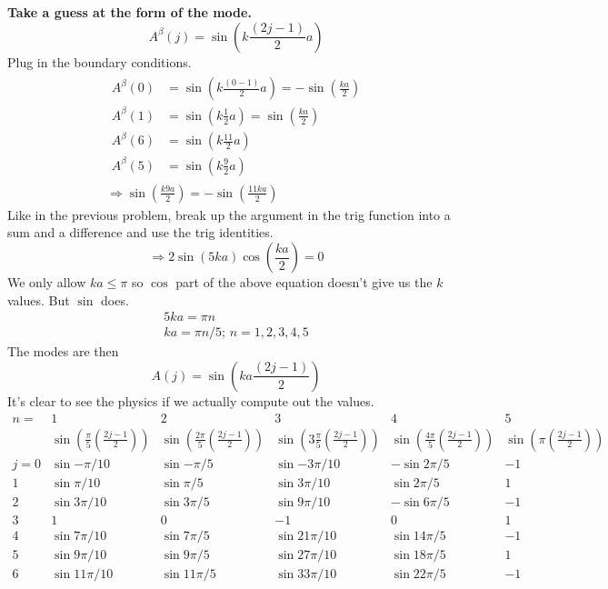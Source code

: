 \documentclass[twoside,10pt]{amsart}
\begin{document}
\textbf{Take a guess at the form of the mode.}
\[
A^{\beta}(j) = \sin{ (k \frac{(2j-1)}{2} a ) }
\]
Plug in the boundary conditions.  
\[
\begin{gathered}
\begin{aligned}
  A^{\beta}(0) & = \sin{ (k \frac{ (0-1)}{2} a ) } = -\sin{ (\frac{ka}{2} ) }  \\
  A^{\beta}(1) & = \sin{ (k \frac{1}{2} a) } = \sin{ (\frac{ka}{2} )}  \\
  A^{\beta}(6) & = \sin{ (k \frac{11}{2} a) }  \\
  A^{\beta}(5) & = \sin{ (k \frac{9}{2} a ) } 
\end{aligned}  \\
\Longrightarrow \sin{ \left( \frac{k9a}{2} \right)} = -  \sin{ \left( \frac{11ka}{2} \right)}
\end{gathered}
\]
Like in the previous problem, break up the argument in the trig function into a sum and a difference and use the trig identities.  
\[
\Longrightarrow 2 \sin{ (5ka)}\cos{ \left( \frac{ka}{2} \right)} = 0 
\]
We only allow $ka \leq \pi$ so $\cos$ part of the above equation doesn't give us the $k$ values.  But $\sin$ does.  
\[
\begin{gathered}
5ka = \pi n \\
ka = \pi n/5; \, n =1,2,3,4,5
\end{gathered}
\]
The modes are then
\[
A(j) = \sin{ \left( ka \frac{ (2j-1)}{2} \right) }
\]
It's clear to see the physics if we actually compute out the values. 
\[
\begin{matrix} 
n =      &    1       &          2    &    3               &  4                   & 5          \\
  &    \sin{ \left( \frac{\pi}{5} \left( \frac{2j-1}{2} \right) \right)} &   \sin{ \left( \frac{2\pi}{5} \left( \frac{2j-1}{2} \right) \right)} &   \sin{ \left( 3\frac{\pi}{5} \left( \frac{2j-1}{2} \right) \right)} &   \sin{ \left( \frac{4\pi}{5} \left( \frac{2j-1}{2} \right) \right)} &   \sin{ \left( \pi \left( \frac{2j-1}{2} \right) \right)}  \\
j = 0 & \sin{ -\pi/10} & \sin{ -\pi/5}   & \sin{ -3\pi/10} & -\sin{ 2\pi /5} & - 1  \\
1 & \sin{ \pi/10} & \sin{ \pi/5}   & \sin{ 3\pi/10} & \sin{ 2\pi /5} &  1   \\
2 & \sin{ 3\pi/10} & \sin{ 3\pi/5}   & \sin{ 9\pi/10} & -\sin{ 6\pi /5} &  -1  \\
3 & 1 & 0   & -1 & 0 &  1  \\
4 & \sin{ 7\pi/10} & \sin{ 7\pi/5}   & \sin{ 21\pi/10} & \sin{ 14\pi /5} &  -1  \\
5 & \sin{ 9\pi/10} & \sin{ 9\pi/5}   & \sin{ 27\pi/10} & \sin{ 18\pi /5} &  1   \\
6 & \sin{ 11\pi/10} & \sin{ 11\pi/5}   & \sin{ 33\pi/10} & \sin{ 22\pi /5} &  -1
\end{matrix}
\]
\end{document}
